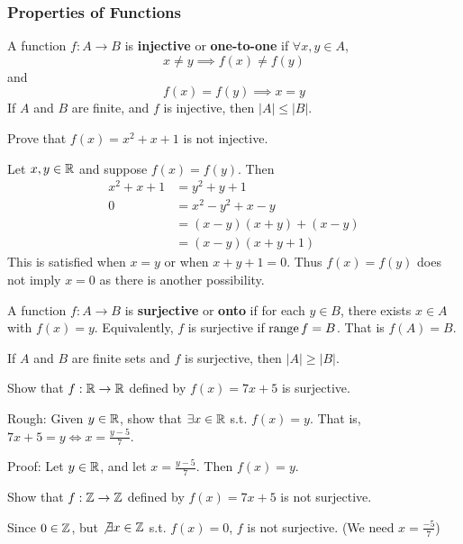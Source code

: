 \documentclass{article}
\begin{document}
    \subsubsection{Properties of Functions}
    \begin{definition}
      A function $f: A \to B$ is \textbf{injective} or \textbf{one-to-one} if $\forall x, y \in A$,
      \[
        x \neq y \implies f(x) \neq f(y)
      \] and
      \[
        f(x) = f(y) \implies x = y
      \]
      If $A$ and $B$ are finite, and $f$ is injective, then $|A| \leq |B|$.
    \end{definition}
    \begin{example}
      Prove that $f(x) = x^2 + x + 1$ is not injective.

      Let $x, y \in \mathbb{R}$ and suppose $f(x) = f(y)$. Then
      \begin{align*}
        x^2 + x + 1 &= y^2 + y + 1\\
        0 &= x^2 - y^2 + x - y\\
        &= (x-y)(x+y) + (x-y)\\
        &= (x-y)(x+y+1)
      \end{align*}
      This is satisfied when $x = y$ or when $x + y + 1 = 0$. Thus $f(x) = f(y)$ does not imply $x = 0$ as there is another possibility.
    \end{example}
    \begin{definition}
      A function $f: A \to B$ is \textbf{surjective} or \textbf{onto} if for each $y \in B$, there exists $x \in A$ with $f(x) = y$. Equivalently, $f$ is surjective if $\operatorname{\text{range}}{f} = B$. That is $f(A) = B$.

      If $A$ and $B$ are finite sets and $f$ is surjective, then $|A| \geq |B|$.
    \end{definition}
    \begin{example}
      Show that $f : \mathbb{R} \to \mathbb{R}$ defined by $f(x) = 7x + 5$ is surjective.

      Rough:
      Given $y \in \mathbb{R}$, show that $\exists x \in \mathbb{R}$ s.t. $f(x)=y$. That is, $7x+ 5 = y \iff x = \frac{y-5}{7}$.

      Proof:
      Let $y \in \mathbb{R}$, and let $x = \frac{y-5}{7}$. Then $f(x) = y$.
    \end{example}
    \begin{example}
      Show that $f : \mathbb{Z} \to \mathbb{Z}$ defined by $f(x) = 7x + 5$ is not surjective.

      Since $0 \in \mathbb{Z}$, but $\not\exists x \in \mathbb{Z}$ s.t. $f(x) = 0$, $f$ is not surjective. (We need $x = \frac{-5}{7}$)
    \end{example}
\end{document}
